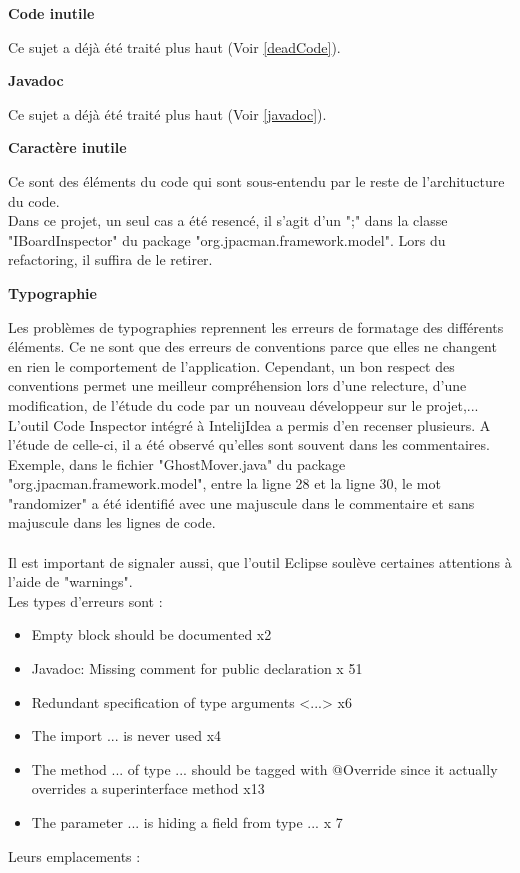 \documentclass[12pt,a4paper,final]{article}
\newcommand{\smalltitle}[1]{\bigskip\large\textbf{#1}\par\normalsize\medskip}
\begin{document}
\smalltitle{Code inutile}
Ce sujet a déjà été traité plus haut (Voir \ref{deadCode}).

\smalltitle{Javadoc}
Ce sujet a déjà été traité plus haut (Voir \ref{javadoc}).

\smalltitle{Caractère inutile}
Ce sont des éléments du code qui sont sous-entendu par le reste de l'architucture du code.\\
Dans ce projet, un seul cas a été resencé, il s'agit d'un ";" dans la classe "IBoardInspector" du package "org.jpacman.framework.model". Lors du refactoring, il suffira de le retirer.

\smalltitle{Typographie}
Les problèmes de typographies reprennent les erreurs de formatage des différents éléments. Ce ne sont que des erreurs de conventions parce que elles ne changent en rien le comportement de l'application. Cependant, un bon respect des conventions permet une meilleur compréhension lors d'une relecture, d'une modification, de l'étude du code par un nouveau développeur sur le projet,...\\
L'outil Code Inspector intégré à IntelijIdea a permis d'en recenser plusieurs. A l'étude de celle-ci, il a été observé qu'elles sont souvent dans les commentaires. Exemple, dans le fichier "GhostMover.java" du package "org.jpacman.framework.model", entre la ligne 28 et la ligne 30, le mot "randomizer" a été identifié avec une majuscule dans le commentaire et sans majuscule dans les lignes de code.\\ \\
Il est important de signaler aussi, que l'outil Eclipse soulève certaines attentions à l'aide de "warnings".\\
Les types d'erreurs sont : 
\begin{itemize}
\item Empty block should be documented x2
\item Javadoc: Missing comment for public declaration x 51
\item Redundant specification of type arguments <...> x6
\item The import ... is never used x4
\item The method ... of type ... should be tagged with @Override since it actually overrides a superinterface method x13
\item The parameter ... is hiding a field from type ... x 7
\end {itemize}
Leurs emplacements : \\
\end{document}
